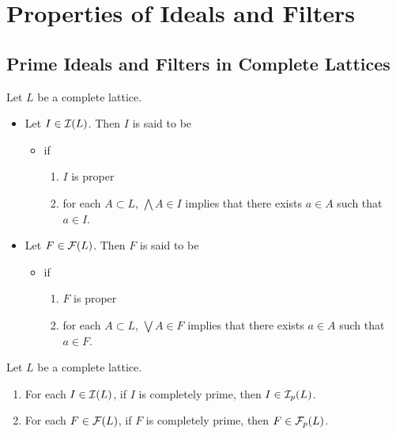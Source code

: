 \documentclass{book}
\begin{document}
	
	
	
	
	
	
	\section{Properties of Ideals and Filters}
	
	\subsection{Prime Ideals and Filters in Complete Lattices}
	
	\begin{defn}
		Let $L$ be a complete lattice. 
		\begin{itemize}
			\item Let $I \in \mathcal{I}(L)$. Then $I$ is said to be
			\begin{itemize}
				\item {} if
				\begin{enumerate}
					\item $I$ is proper
					\item for each $A \subset L$, $\bigwedge A \in I$ implies that there exists $a \in A$ such that $a \in I$.
				\end{enumerate}
			\end{itemize} 
			\item Let $F \in \mathcal{F}(L)$. Then $F$ is said to be 
			\begin{itemize}
				\item {} if 
				\begin{enumerate}
					\item $F$ is proper
					\item for each $A \subset L$, $\bigvee A \in F$ implies that there exists $a \in A$ such that $a \in F$.
				\end{enumerate}
			\end{itemize} 
		\end{itemize}
	\end{defn}
	
	\begin{ex}
		Let $L$ be a complete lattice.
		\begin{enumerate}
			\item For each $I \in \mathcal{I}(L)$, if $I$ is completely prime, then $I \in \mathcal{I}_p(L)$.
			\item For each $F \in \mathcal{F}(L)$, if $F$ is completely prime, then $F \in \mathcal{F}_p(L)$. 
		\end{enumerate}
	\end{ex}
	
\end{document}
